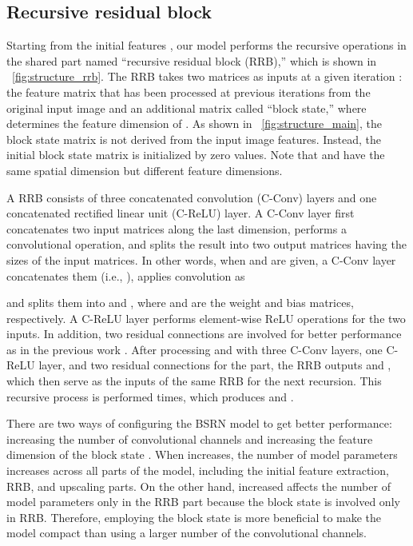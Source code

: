 \documentclass[runningheads]{llncs}
\begin{document}
\subsection{Recursive residual block}
\label{sec:rrb}

Starting from the initial features , our model performs the recursive operations in the shared part named ``recursive residual block (RRB),'' which is shown in \figurename~\ref{fig:structure_rrb}.
The RRB takes two matrices as inputs at a given iteration : the feature matrix  that has been processed at previous iterations from the original input image and an additional matrix  called ``block state,'' where  determines the feature dimension of .
As shown in \figurename~\ref{fig:structure_main}, the block state matrix is not derived from the input image features.
Instead, the initial block state matrix  is initialized by zero values.
Note that  and  have the same spatial dimension but different feature dimensions.

A RRB consists of three concatenated convolution (C-Conv) layers and one concatenated rectified linear unit (C-ReLU) layer.
A C-Conv layer first concatenates two input matrices along the last dimension, performs a convolutional operation, and splits the result into two output matrices having the sizes of the input matrices.
In other words, when  and  are given, a C-Conv layer concatenates them (i.e., ), applies convolution as

and splits them into  and , where  and  are the weight and bias matrices, respectively.
A C-ReLU layer performs element-wise ReLU operations for the two inputs.
In addition, two residual connections are involved for better performance as in the previous work \cite{kim2016accurate,kim2018deep}.
After processing  and  with three C-Conv layers, one C-ReLU layer, and two residual connections for the  part, the RRB outputs  and , which then serve as the inputs of the same RRB for the next recursion.
This recursive process is performed  times, which produces  and .

There are two ways of configuring the BSRN model to get better performance: increasing the number of convolutional channels  and increasing the feature dimension of the block state .
When  increases, the number of model parameters increases across all parts of the model, including the initial feature extraction, RRB, and upscaling parts.
On the other hand, increased  affects the number of model parameters only in the RRB part because the block state is involved only in RRB.
Therefore, employing the block state is more beneficial to make the model compact than using a larger number of the convolutional channels.
\end{document}
